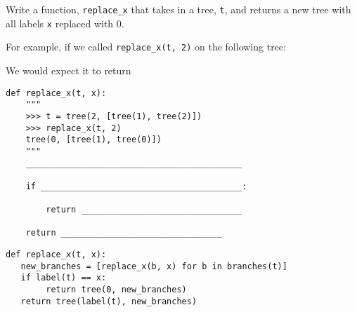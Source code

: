 \begin{blocksection}
\question Write a function, \lstinline$replace_x$ that takes in a tree, \lstinline$t$, and returns a new tree with all
labels \lstinline$x$ replaced with 0.

For example, if we called \lstinline$replace_x(t, 2)$ on the following tree:


We would expect it to return


\begin{lstlisting}
def replace_x(t, x):
    """
    >>> t = tree(2, [tree(1), tree(2)])
    >>> replace_x(t, 2)
    tree(0, [tree(1), tree(0)])
    """
    ___________________________________________

    if ________________________________________:

        return ________________________________

    return ________________________________
\end{lstlisting}

\begin{solution}
\begin{lstlisting}
def replace_x(t, x):
   new_branches = [replace_x(b, x) for b in branches(t)]
   if label(t) == x:
        return tree(0, new_branches)
   return tree(label(t), new_branches)
\end{lstlisting}


\end{solution}
\end{blocksection}
